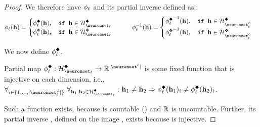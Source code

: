 \begin{proof}
    We therefore have $\phi_{\ell}$ and its partial inverse defined as:
    \begin{align}
        \causalmap_{\layer}(\hiddenstates)=
        \begin{cases}
        \causalmap_{\layer}^{\noninter}(\hiddenstates),\quad \texttt{if $\hiddenstates\in\AllInpIntActivationsLayerH{\layer}$}\\
        \causalmap_{\layer}^{\inter}(\hiddenstates),\quad \texttt{if $\hiddenstates\in\AllInpIntActivationsLayerTwoH{\layer}$}
        \end{cases}
        \qquad
        \causalmap_{\layer}^{-1}(\hiddenstates)=\begin{cases}
        {\causalmap_{\layer}^{\noninter}}^{-1}(\hiddenstates),\quad \texttt{if $\hiddenstates\in\AllInpIntTransformedActivationsLayerOneH{\layer}$}\\
        {\causalmap_{\layer}^{\inter}}^{-1}(\hiddenstates),\quad \texttt{if $\hiddenstates\in\AllInpIntTransformedActivationsLayerTwoH{\layer}$}
        \end{cases}
    \end{align}
    

    
    We now define $\causalmap_{\layer}^{\noninter}$.
    \begin{definition}\label{Definition:phi_1}
        Partial map $\causalmap_{\layer}^{\noninter}: \AllInpIntActivationsLayerH{\layer} \to \R^{|\neuronset^{\layer}|}$ is some fixed function 
        that is injective on each dimension, i.e., 
            $\forall_{i\in\{1,...,|\neuronset^{\causalmap}_{\layer}|\}}\ \forall_{\hiddenstates_1,\hiddenstates_2\in\AllInpIntActivationsLayerH{\layer}}:\hiddenstates_1\neq\hiddenstates_2\Rightarrow\causalmap_{\layer}^{\noninter}(\hiddenstates_1)_i\neq\causalmap_{\layer}^{\noninter}(\hiddenstates_2)_i$.
    \end{definition}
    Such a function exists, because \smash{$\AllInpIntActivationsLayerH{\layer}$} is countable () and $\mathbb{R}$ is uncountable.
    Further, its partial inverse , defined on the image \smash{$\AllInpIntTransformedActivationsLayerOneH{\layer}$}, exists because \smash{$\causalmap_\layer^{\noninter}$} is injective.
    

\end{proof}

